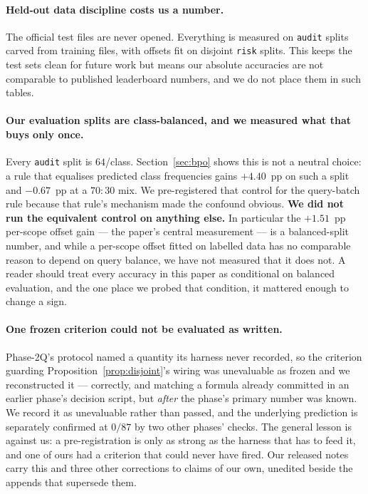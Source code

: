 \paragraph{Held-out data discipline costs us a number.}
The official test files are never opened. Everything is measured on \texttt{audit}
splits carved from training files, with offsets fit on disjoint \texttt{risk}
splits. This keeps the test sets clean for future work but means our absolute
accuracies are not comparable to published leaderboard numbers, and we do not place
them in such tables.

\paragraph{Our evaluation splits are class-balanced, and we measured what that buys
only once.}
Every \texttt{audit} split is $64$/class. Section~\ref{sec:bpo} shows this is not a
neutral choice: a rule that equalises predicted class frequencies gains $+4.40$~pp
on such a split and $-0.67$~pp at a $70{:}30$ mix. We pre-registered that control
for the query-batch rule because that rule's mechanism made the confound obvious.
\textbf{We did not run the equivalent control on anything else.} In particular the
$+1.51$~pp per-scope offset gain --- the paper's central measurement --- is a
balanced-split number, and while a per-scope offset fitted on labelled data has no
comparable reason to depend on query balance, we have not measured that it does not.
A reader should treat every accuracy in this paper as conditional on balanced
evaluation, and the one place we probed that condition, it mattered enough to change
a sign.

\paragraph{One frozen criterion could not be evaluated as written.}
Phase-2Q's protocol named a quantity its harness never recorded, so the criterion
guarding Proposition~\ref{prop:disjoint}'s wiring was unevaluable as frozen and we
reconstructed it --- correctly, and matching a formula already committed in an
earlier phase's decision script, but \emph{after} the phase's primary number was
known. We record it as unevaluable rather than passed, and the underlying prediction
is separately confirmed at $0/87$ by two other phases' checks. The general lesson is
against us: a pre-registration is only as strong as the harness that has to feed it,
and one of ours had a criterion that could never have fired. Our released notes
carry this and three other corrections to claims of our own, unedited beside the
appends that supersede them.

